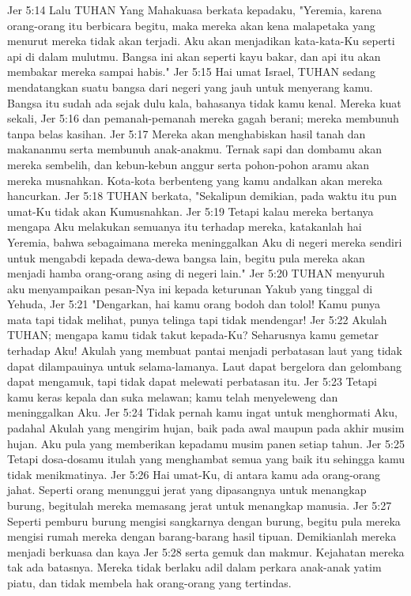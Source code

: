Jer 5:14  Lalu TUHAN Yang Mahakuasa berkata kepadaku, "Yeremia, karena orang-orang itu berbicara begitu, maka mereka akan kena malapetaka yang menurut mereka tidak akan terjadi. Aku akan menjadikan kata-kata-Ku seperti api di dalam mulutmu. Bangsa ini akan seperti kayu bakar, dan api itu akan membakar mereka sampai habis."
Jer 5:15  Hai umat Israel, TUHAN sedang mendatangkan suatu bangsa dari negeri yang jauh untuk menyerang kamu. Bangsa itu sudah ada sejak dulu kala, bahasanya tidak kamu kenal. Mereka kuat sekali,
Jer 5:16  dan pemanah-pemanah mereka gagah berani; mereka membunuh tanpa belas kasihan.
Jer 5:17  Mereka akan menghabiskan hasil tanah dan makananmu serta membunuh anak-anakmu. Ternak sapi dan dombamu akan mereka sembelih, dan kebun-kebun anggur serta pohon-pohon aramu akan mereka musnahkan. Kota-kota berbenteng yang kamu andalkan akan mereka hancurkan.
Jer 5:18  TUHAN berkata, "Sekalipun demikian, pada waktu itu pun umat-Ku tidak akan Kumusnahkan.
Jer 5:19  Tetapi kalau mereka bertanya mengapa Aku melakukan semuanya itu terhadap mereka, katakanlah hai Yeremia, bahwa sebagaimana mereka meninggalkan Aku di negeri mereka sendiri untuk mengabdi kepada dewa-dewa bangsa lain, begitu pula mereka akan menjadi hamba orang-orang asing di negeri lain."
Jer 5:20  TUHAN menyuruh aku menyampaikan pesan-Nya ini kepada keturunan Yakub yang tinggal di Yehuda,
Jer 5:21  "Dengarkan, hai kamu orang bodoh dan tolol! Kamu punya mata tapi tidak melihat, punya telinga tapi tidak mendengar!
Jer 5:22  Akulah TUHAN; mengapa kamu tidak takut kepada-Ku? Seharusnya kamu gemetar terhadap Aku! Akulah yang membuat pantai menjadi perbatasan laut yang tidak dapat dilampauinya untuk selama-lamanya. Laut dapat bergelora dan gelombang dapat mengamuk, tapi tidak dapat melewati perbatasan itu.
Jer 5:23  Tetapi kamu keras kepala dan suka melawan; kamu telah menyeleweng dan meninggalkan Aku.
Jer 5:24  Tidak pernah kamu ingat untuk menghormati Aku, padahal Akulah yang mengirim hujan, baik pada awal maupun pada akhir musim hujan. Aku pula yang memberikan kepadamu musim panen setiap tahun.
Jer 5:25  Tetapi dosa-dosamu itulah yang menghambat semua yang baik itu sehingga kamu tidak menikmatinya.
Jer 5:26  Hai umat-Ku, di antara kamu ada orang-orang jahat. Seperti orang menunggui jerat yang dipasangnya untuk menangkap burung, begitulah mereka memasang jerat untuk menangkap manusia.
Jer 5:27  Seperti pemburu burung mengisi sangkarnya dengan burung, begitu pula mereka mengisi rumah mereka dengan barang-barang hasil tipuan. Demikianlah mereka menjadi berkuasa dan kaya
Jer 5:28  serta gemuk dan makmur. Kejahatan mereka tak ada batasnya. Mereka tidak berlaku adil dalam perkara anak-anak yatim piatu, dan tidak membela hak orang-orang yang tertindas.
